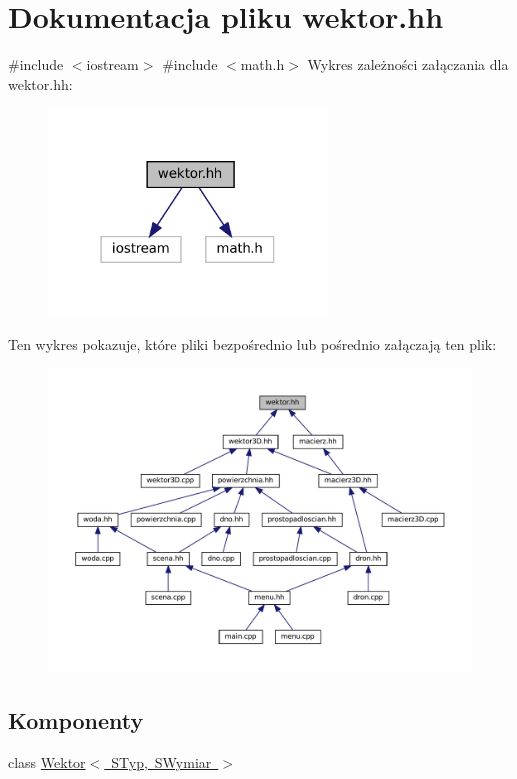 \hypertarget{wektor_8hh}{}\section{Dokumentacja pliku wektor.\+hh}
\label{wektor_8hh}
{\ttfamily \#include $<$iostream$>$}\newline
{\ttfamily \#include $<$math.\+h$>$}\newline
Wykres zależności załączania dla wektor.\+hh\+:\nopagebreak
\begin{figure}[H]
\begin{center}
\leavevmode
\includegraphics[width=210pt]{wektor_8hh__incl}
\end{center}
\end{figure}
Ten wykres pokazuje, które pliki bezpośrednio lub pośrednio załączają ten plik\+:\nopagebreak
\begin{figure}[H]
\begin{center}
\leavevmode
\includegraphics[width=350pt]{wektor_8hh__dep__incl}
\end{center}
\end{figure}
\subsection*{Komponenty}
\begin{DoxyCompactItemize}
\item 
class \mbox{\hyperlink{class_wektor}{Wektor$<$ S\+Typ, S\+Wymiar $>$}}
\end{DoxyCompactItemize}
